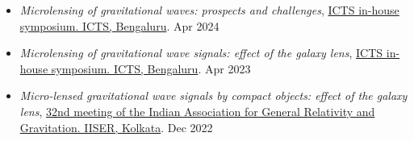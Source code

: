 \begin{itemize}
    \item \textit{Microlensing of gravitational waves: prospects and challenges}, \href{https://www.icts.res.in/inhouse2024}{ICTS in-house symposium. ICTS, Bengaluru}. \hfill{Apr 2024}

    \item \textit{Microlensing of gravitational wave signals: effect of the galaxy lens}, \href{https://www.icts.res.in/inhouse2023}{ICTS in-house symposium. ICTS, Bengaluru}. \hfill{Apr 2023}

    \item \textit{Micro-lensed gravitational wave signals by compact objects: effect of the galaxy lens}, \href{https://www.iiserkol.ac.in/~iagrg32/}{32nd meeting of the Indian Association for General Relativity and Gravitation. IISER, Kolkata}. \hfill{Dec 2022}
    
\end{itemize}